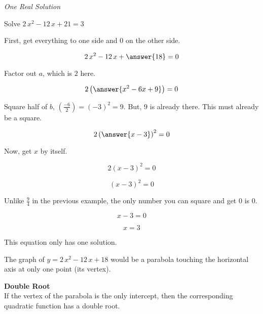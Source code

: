 \documentclass{ximera}
\begin{document}
\begin{example} \textit{One Real Solution}

Solve $2 \, x^2 - 12 \, x + 21 = 3$ \\

\begin{explanation}


First, get everything to one side and $0$ on the other side.



\[  2 \, x^2 - 12 \, x + \answer{18} = 0  \]

Factor out $a$, which is $2$ here.

\[  2 \left( \answer{x^2 - 6x + 9} \right) = 0  \]


Square half of $b$, $\left(\frac{-6}{2}\right) = (-3)^2 = 9$.  But, $9$ is already there.  This must already be a square.



\[  2 \left( \answer{x - 3} \right)^2 = 0  \]


Now, get $x$ by itself.

\[  2 (x - 3)^2 = 0  \]

\[  (x - 3)^2 = 0  \]


Unlike $\frac{9}{4}$ in the previous example, the only number you can square and get $0$ is $0$.

\[  x - 3 = 0  \]

\[  x = 3  \]


This equation only has one solution.


\end{explanation}
\end{example}



The graph of $y = 2 \, x^2 - 12\, x + 18$ would be a parabola touching the horizontal axis at only one point (its vertex).




\begin{idea} \textbf{\textcolor{red!80!black}{Double Root}} \\

If the vertex of the parabola is the only intercept, then the corresponding quadratic function has a double root.


\end{idea}
\end{document}
